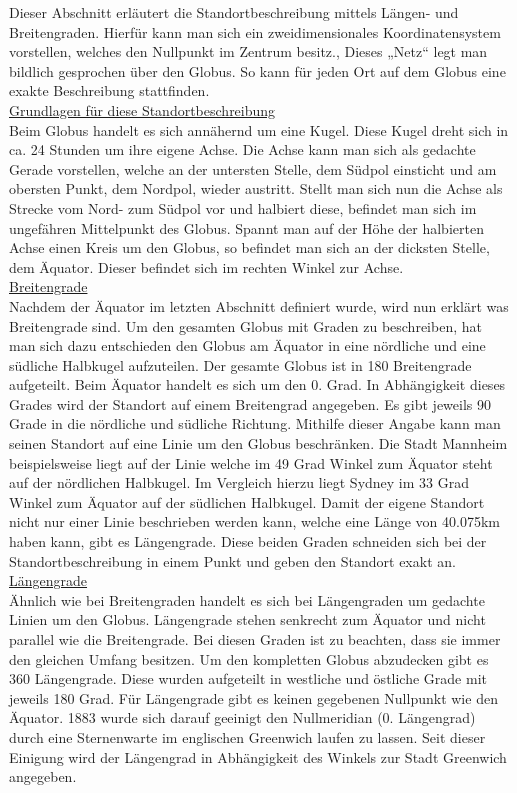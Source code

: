 Dieser Abschnitt erläutert die Standortbeschreibung mittels Längen- und Breitengraden.
Hierfür kann man sich ein zweidimensionales Koordinatensystem vorstellen, welches den Nullpunkt im Zentrum besitz., Dieses „Netz“ legt man bildlich gesprochen über den Globus. So kann für jeden Ort auf dem Globus eine exakte Beschreibung stattfinden. 
\\\underline{Grundlagen für diese Standortbeschreibung}
\\Beim Globus handelt es sich annähernd um eine Kugel. Diese Kugel dreht sich in ca. 24 Stunden um ihre eigene Achse. Die Achse kann man sich als gedachte Gerade vorstellen, welche an der untersten Stelle, dem Südpol einsticht und am obersten Punkt, dem Nordpol, wieder austritt. Stellt man sich nun die Achse als Strecke vom Nord- zum Südpol vor und halbiert diese, befindet man sich im ungefähren Mittelpunkt des Globus. Spannt man auf der Höhe der halbierten Achse einen Kreis um den Globus, so befindet man sich an der dicksten Stelle, dem Äquator. Dieser befindet sich im rechten Winkel zur Achse.
\\\underline{Breitengrade}
\\Nachdem der Äquator im letzten Abschnitt definiert wurde, wird nun erklärt was Breitengrade sind. Um den gesamten Globus mit Graden zu beschreiben, hat man sich dazu entschieden den Globus am Äquator in eine nördliche und eine südliche Halbkugel aufzuteilen. Der gesamte Globus ist in 180 Breitengrade aufgeteilt. Beim Äquator handelt es sich um den 0. Grad. In Abhängigkeit dieses Grades wird der Standort auf einem Breitengrad angegeben. Es gibt jeweils 90 Grade in die nördliche und südliche Richtung. Mithilfe dieser Angabe kann man seinen Standort auf eine Linie um den Globus beschränken. Die Stadt Mannheim beispielsweise liegt auf der Linie welche im 49 Grad Winkel zum Äquator steht auf der nördlichen Halbkugel. Im Vergleich hierzu liegt Sydney im 33 Grad Winkel zum Äquator auf der südlichen Halbkugel.
Damit der eigene Standort nicht nur einer Linie beschrieben werden kann, welche eine Länge von 40.075km haben kann, gibt es Längengrade. Diese beiden Graden schneiden sich bei der Standortbeschreibung in einem Punkt und geben den Standort exakt an.
\\\underline{Längengrade}
\\Ähnlich wie bei Breitengraden handelt es sich bei Längengraden um gedachte Linien um den Globus. Längengrade stehen  senkrecht zum Äquator und nicht parallel wie die Breitengrade. Bei diesen Graden ist zu beachten, dass sie immer den gleichen Umfang besitzen. Um den kompletten Globus abzudecken gibt es 360 Längengrade. Diese wurden aufgeteilt in westliche und östliche Grade mit jeweils 180 Grad. Für Längengrade gibt es keinen gegebenen Nullpunkt wie den Äquator. 1883 wurde sich darauf geeinigt den Nullmeridian (0. Längengrad) durch eine Sternenwarte im englischen Greenwich laufen zu lassen. Seit dieser Einigung wird der Längengrad in Abhängigkeit des Winkels zur Stadt Greenwich angegeben. 
